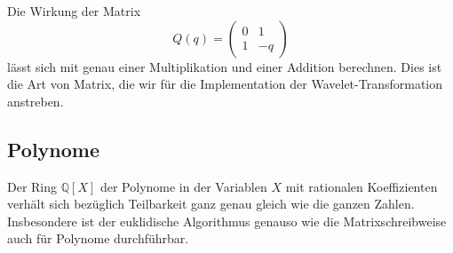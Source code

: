 Die Wirkung der Matrix
\[
Q(q) = \begin{pmatrix} 0 & 1 \\ 1 & -q \end{pmatrix}
\]
lässt sich mit genau einer Multiplikation und einer Addition
berechnen.
Dies ist die Art von Matrix, die wir für die Implementation der
Wavelet-Transformation anstreben.

\subsection{Polynome}
Der Ring $\mathbb{Q}[X]$ der Polynome in der Variablen $X$ mit rationalen
Koeffizienten verhält
sich bezüglich Teilbarkeit ganz genau gleich wie die ganzen Zahlen.
Insbesondere ist der euklidische Algorithmus genauso wie die
Matrixschreibweise auch für Polynome durchführbar.

